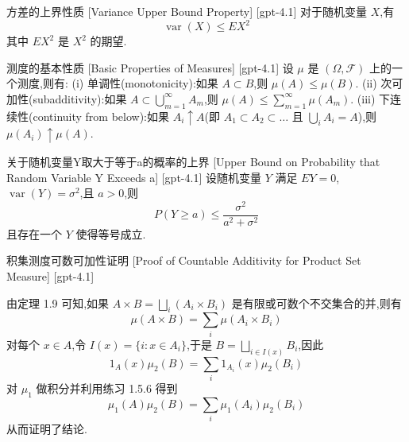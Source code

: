 \documentclass[UTF8]{ctexart}
\begin{document}
    
    
    \begin{ppt}
        {方差的上界性质}
        [Variance Upper Bound Property]
        [gpt-4.1]
        对于随机变量 $X$,有
\[
\operatorname{var}( X ) \leq E X^{2}
\]
其中 $E X^{2}$ 是 $X^{2}$ 的期望.
    \end{ppt}
    
    
    
    \begin{thm}
        {测度的基本性质}
        [Basic Properties of Measures]
        [gpt-4.1]
        设 $\mu$ 是 $(\Omega, \mathcal{F})$ 上的一个测度,则有:
(i) 单调性(monotonicity):如果 $A \subset B$,则 $\mu(A) \leq \mu(B)$.
(ii) 次可加性(subadditivity):如果 $A \subset \bigcup_{m=1}^{\infty} A_{m}$,则 $\mu(A) \leq \sum_{m=1}^{\infty} \mu(A_{m})$.
(iii) 下连续性(continuity from below):如果 $A_{i} \uparrow A$(即 $A_{1} \subset A_{2} \subset \ldots$ 且 $\bigcup_{i} A_{i} = A$),则 $\mu(A_{i}) \uparrow \mu(A)$.

    \end{thm}
    
    
    
    \begin{thm}
        {关于随机变量Y取大于等于a的概率的上界}
        [Upper Bound on Probability that Random Variable Y Exceeds a]
        [gpt-4.1]
        设随机变量 $Y$ 满足 $E Y = 0$,$\operatorname{var}(Y) = \sigma^2$,且 $a > 0$,则
\[
P(Y \geq a) \leq \frac{\sigma^2}{a^2 + \sigma^2}
\]
且存在一个 $Y$ 使得等号成立.

    \end{thm}
    
    
    
    \begin{prf}
        {积集测度可数可加性证明}
        [Proof of Countable Additivity for Product Set Measure]
        [gpt-4.1]
        
由定理 1.9 可知,如果 $A \times B = \bigsqcup_{i} (A_{i} \times B_{i})$ 是有限或可数个不交集合的并,则有
\[
\mu(A \times B) = \sum_{i} \mu(A_{i} \times B_{i})
\]
对每个 $x \in A$,令 $I(x) = \{ i : x \in A_{i} \}$,于是 $B = \bigsqcup_{i \in I(x)} B_{i}$,因此
\[
1_{A}(x) \mu_{2}(B) = \sum_{i} 1_{A_{i}}(x) \mu_{2}(B_{i})
\]
对 $\mu_{1}$ 做积分并利用练习 1.5.6 得到
\[
\mu_{1}(A) \mu_{2}(B) = \sum_{i} \mu_{1}(A_{i}) \mu_{2}(B_{i})
\]
从而证明了结论.

    \end{prf}
    
\end{document}
